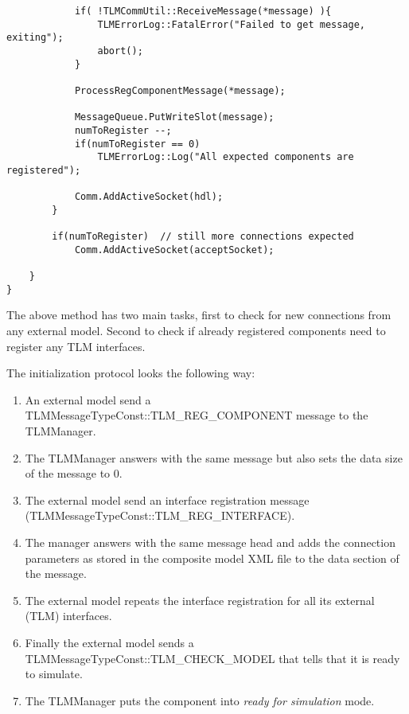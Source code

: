 {\begin{verbatim}
            if( !TLMCommUtil::ReceiveMessage(*message) ){
                TLMErrorLog::FatalError("Failed to get message, exiting");
                abort();
            }

            ProcessRegComponentMessage(*message);

            MessageQueue.PutWriteSlot(message);
            numToRegister --;
            if(numToRegister == 0)
                TLMErrorLog::Log("All expected components are registered");

            Comm.AddActiveSocket(hdl);
        }

        if(numToRegister)  // still more connections expected
            Comm.AddActiveSocket(acceptSocket);

    }
}
\end{verbatim}
}
The above method has two main tasks, first to check for new connections from any external model. 
Second to check if already registered components need to register any TLM interfaces.

The initialization protocol looks the following way:
\begin{enumerate}
\item An external model send a TLMMessageTypeConst::TLM\_REG\_COMPONENT message to the TLMManager.
\item The TLMManager answers with the same message but also sets the data size of the message to 0.
\item The external model send an interface registration message (TLMMessageTypeConst::TLM\_REG\_INTERFACE).
\item The manager answers with the same message head and adds the connection parameters as stored in the composite model XML file to the data section of the message.
\item The external model repeats the interface registration for all its external (TLM) interfaces.
\item Finally the external model sends a TLMMessageTypeConst::TLM\_CHECK\_MODEL that tells that it is ready to simulate.
\item The TLMManager puts the component into {\em ready for simulation} mode.
\end{enumerate}

